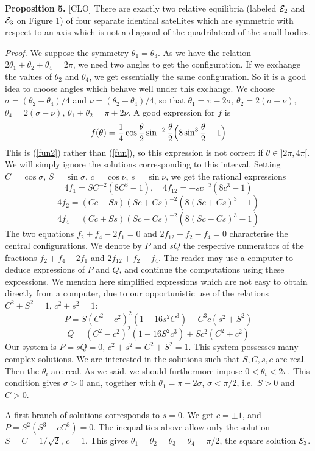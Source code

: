 \documentclass[11pt]{article}
\begin{document}
{\bf Proposition 5.}  [CLO] There are exactly two relative equilibria  (labeled ${\cal E}_2$ and ${\cal E}_3$ on Figure 1) of four separate identical satellites which are symmetric
with respect to an axis which is not a diagonal of the quadrilateral of the small bodies.


{\sl Proof.} We suppose the symmetry $\theta_1=\theta_3$. As we have
the relation $2\theta_1+\theta_2+\theta_4=2\pi$, we need two angles
to get the configuration. If we exchange the values of $\theta_2$
and $\theta_4$, we get essentially the same configuration. So it is
a good idea to choose angles which behave well under this exchange.
We choose $\sigma=(\theta_2+\theta_4)/4$ and
$\nu=(\theta_2-\theta_4)/4$, so that $\theta_1=\pi-2\sigma$,
$\theta_2=2(\sigma+\nu)$, $\theta_4=2(\sigma-\nu)$,
$\theta_1+\theta_2=\pi+2\nu$. A good expression for $f$ is
$$f(\theta)={1\over 4}\cos{\theta\over 2}\sin^{-2}{\theta\over
2}\Bigl(8\sin^3{\theta\over 2}-1\Bigr)$$ This is (\ref{fun2}) rather
than (\ref{fun}), so this expression is not correct if
$\theta\in]2\pi,4\pi[$. We will simply ignore the solutions
corresponding to this interval. Setting $C=\cos\sigma$,
$S=\sin\sigma$, $c=\cos\nu$, $s=\sin\nu$, we get the rational
expressions
$$4f_1=SC^{-2}(8C^3-1),\quad 4f_{12}=-sc^{-2}(8c^3-1)$$
$$4f_2=(Cc-Ss)(Sc+Cs)^{-2}(8(Sc+Cs)^3-1)$$
$$4f_4=(Cc+Ss)(Sc-Cs)^{-2}(8(Sc-Cs)^3-1)$$
The two equations $f_2+f_4-2f_1=0$ and $2f_{12}+f_2-f_4=0$
characterise the central configurations. We denote by $P$ and $sQ$
the respective numerators of the fractions $f_2+f_4-2f_1$ and
$2f_{12}+f_2-f_4$. The reader may use a computer to deduce
expressions of $P$ and $Q$, and continue the computations using
these expressions. We mention here simplified expressions which are
not easy to obtain directly from a computer, due to our
opportunistic use of the relations $C^2+S^2=1$, $c^2+s^2=1$:
$$P=S(C^2-c^2)^2(1-16s^2C^3)-C^3c(s^2+S^2)$$
$$Q=(C^2-c^2)^2(1-16S^2c^3)+Sc^2(C^2+c^2)$$
Our system is $P=sQ=0$, $c^2+s^2=C^2+S^2=1$. This system possesses many complex solutions. We are interested in the solutions such that $S,C,s,c$ are real. Then the $\theta_i$ are real. As we said, we should furthermore impose $0<\theta_i<2\pi$. This condition gives $\sigma>0$ and, together with $\theta_1=\pi-2\sigma$, $\sigma<\pi/2$, i.e.\ $S>0$ and $C>0$.

A first branch of solutions corresponds to $s=0$. We get $c=\pm1$, and
$P=S^2(S^3-cC^3)=0$. The inequalities above allow only the solution $S=C=1/\sqrt2$, $c=1$. This gives $\theta_1=\theta_2=\theta_3=\theta_4=\pi/2$, the square solution ${\cal E}_3$.
\end{document}
